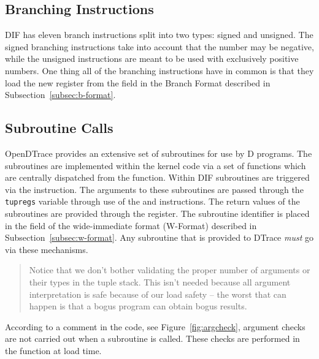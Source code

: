 \subsection{Branching Instructions}

DIF has eleven branch instructions split into two types: signed and
unsigned.  The signed branching instructions take into account that
the number may be negative, while the unsigned instructions are meant
to be used with exclusively positive numbers. One thing all of the
branching instructions have in common is that they load the new
 register from the  field in the Branch
Format described in Subsection~\ref{subsec:b-format}.

\subsection{Subroutine Calls}
\label{sec:subroutines}

OpenDTrace provides an extensive set of subroutines for use by D programs.
The subroutines are implemented within the kernel code via a set of
functions which are centrally dispatched from the
 function.  Within DIF subroutines are
triggered via the  instruction. The arguments to
these subroutines are passed through the \verb|tupregs| variable
through use of the  and 
instructions. The return values of the subroutines are provided
through the  register. The subroutine identifier is
placed in the  field of the wide-immediate format (W-Format)
described in Subsection~\ref{subsec:w-format}. Any subroutine that is provided
to DTrace \emph{must} go via these mechanisms.

\begin{quote}
  Notice that we don't bother validating the proper number of
  arguments or their types in the tuple stack.  This isn't needed
  because all argument interpretation is safe because of our load
  safety -- the worst that can happen is that a bogus program can
  obtain bogus results.
\label{fig:argcheck}
\end{quote}

According to a comment in the code, see Figure~\ref{fig:argcheck}, argument
checks are not carried out when a subroutine is called. These checks are
performed in the  function at load time.


